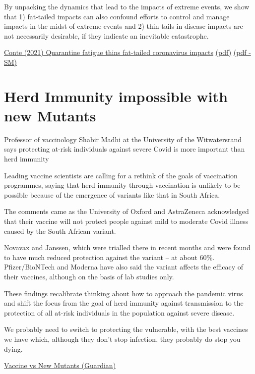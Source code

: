 \documentclass[
]{book}
\begin{document}
By unpacking the dynamics that lead to the impacts of extreme events, we show that
1) fat-tailed impacts can also confound efforts to control and manage impacts
in the midst of extreme events and
2) thin tails in disease impacts are not necessarily desirable,
if they indicate an inevitable catastrophe.

\href{https://www.medrxiv.org/content/10.1101/2021.01.07.21249366v1}{Conte (2021) Quarantine fatigue thins fat-tailed coronavirus impacts}
\href{pdf/Conte_2021_Fat-tailed_Corona.pdf}{(pdf)}
\href{pdf/Conte_2021_Fat-tailed_Corona_SM.pdf}{(pdf - SM)}

\hypertarget{herd-immunity-impossible-with-new-mutants}{%
\section{Herd Immunity impossible with new Mutants}\label{herd-immunity-impossible-with-new-mutants}}

Professor of vaccinology Shabir Madhi at the University of the Witwatersrand says protecting at-risk individuals against severe Covid is more important than herd immunity

Leading vaccine scientists are calling for a rethink of the goals of vaccination programmes, saying that herd immunity through vaccination is unlikely to be possible because of the emergence of variants like that in South Africa.

The comments came as the University of Oxford and AstraZeneca acknowledged that their vaccine will not protect people against mild to moderate Covid illness caused by the South African variant.

Novavax and Janssen, which were trialled there in recent months and were found to have much reduced protection against the variant -- at about 60\%. Pfizer/BioNTech and Moderna have also said the variant affects the efficacy of their vaccines, although on the basis of lab studies only.

These findings recalibrate thinking about how to approach the pandemic virus and shift the focus from the goal of herd immunity against transmission to the protection of all at-risk individuals in the population against severe disease.

We probably need to switch to protecting the vulnerable, with the best vaccines we have which, although they don't stop infection, they probably do stop you dying.

\href{https://www.theguardian.com/society/2021/feb/07/scientists-call-for-rethink-as-doubts-grow-about-achieving-herd-immunity}{Vaccine vs New Mutants (Guardian)}
\end{document}
